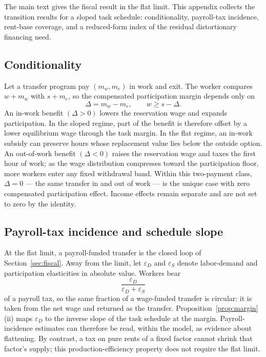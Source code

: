 \documentclass[12pt]{article}
\theoremstyle{plain}
\begin{document}
The main text gives the fiscal result in the flat limit. This appendix collects the transition results for a sloped task schedule: conditionality, payroll-tax incidence, rent-base coverage, and a reduced-form index of the residual distortionary financing need.

\subsection{Conditionality}\label{app:conditionality}

Let a transfer program pay $(m_w,m_e)$ in work and exit. The worker compares $w+m_w$ with $s+m_e$, so the compensated participation margin depends only on
\[
\Delta=m_w-m_e,
\qquad
w\ge s-\Delta.
\]
An in-work benefit $(\Delta>0)$ lowers the reservation wage and expands participation. In the sloped regime, part of the benefit is therefore offset by a lower equilibrium wage through the task margin. In the flat regime, an in-work subsidy can preserve hours whose replacement value lies below the outside option. An out-of-work benefit $(\Delta<0)$ raises the reservation wage and taxes the first hour of work; as the wage distribution compresses toward the participation floor, more workers enter any fixed withdrawal band. Within this two-payment class, $\Delta=0$ --- the same transfer in and out of work --- is the unique case with zero compensated participation effect. Income effects remain separate and are not set to zero by the identity.

\subsection{Payroll-tax incidence and schedule slope}\label{app:funding}

At the flat limit, a payroll-funded transfer is the closed loop of Section~\ref{sec:fiscal}. Away from the limit, let $\varepsilon_D$ and $\varepsilon_S$ denote labor-demand and participation elasticities in absolute value. Workers bear
\[
\frac{\varepsilon_D}{\varepsilon_D+\varepsilon_S}
\]
of a payroll tax, so the same fraction of a wage-funded transfer is circular: it is taken from the net wage and returned as the transfer. Proposition~\ref{prop:margin}(ii) maps $\varepsilon_D$ to the inverse slope of the task schedule at the margin. Payroll-incidence estimates can therefore be read, within the model, as evidence about flattening. By contrast, a tax on pure rents of a fixed factor cannot shrink that factor's supply; this production-efficiency property does not require the flat limit.
\end{document}

